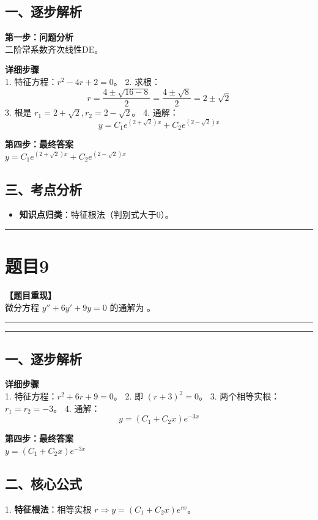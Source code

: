 \documentclass[12pt, a4paper]{ctexart}
\newcommand{\TopSeparator}{
    \par\noindent\rule{\textwidth}{1.5pt}\vspace{0.5em} %
}
\newcommand{\AnalysisSeparator}{
    \par\noindent\rule{\textwidth}{0.5pt}\vspace{0.2em}\hrule\vspace{0.5em} %
}
\newenvironment{RedAnalysis}{
    \par
    \color{red} %
}{
    \par
    \color{black} %
}
\begin{document}
\begin{RedAnalysis}

\subsection*{一、逐步解析}

\textbf{第一步：问题分析} \\
二阶常系数齐次线性DE。

\textbf{详细步骤} \\
1. 特征方程：$r^2 - 4r + 2 = 0$。
2. 求根：
   \[ r = \frac{4 \pm \sqrt{16-8}}{2} = \frac{4 \pm \sqrt{8}}{2} = 2 \pm \sqrt{2} \]
3. 根是 $r_1 = 2+\sqrt{2}, r_2 = 2-\sqrt{2}$。
4. 通解：
   \[ y = C_1 e^{(2+\sqrt{2})x} + C_2 e^{(2-\sqrt{2})x} \]

\textbf{第四步：最终答案} \\
$ y = C_1 e^{(2+\sqrt{2})x} + C_2 e^{(2-\sqrt{2})x} $

\subsection*{三、考点分析}
\begin{itemize}
    \item \textbf{知识点归类}：特征根法（判别式大于0）。
\end{itemize}

\end{RedAnalysis}

\vspace{2em}

\TopSeparator
\section*{题目9}

\textbf{【题目重现】} \\
微分方程 $ y'' + 6y' + 9y = 0 $ 的通解为 \underline{\hspace{2cm}}。

\AnalysisSeparator

\begin{RedAnalysis}

\subsection*{一、逐步解析}

\textbf{详细步骤} \\
1. 特征方程：$r^2 + 6r + 9 = 0$。
2. 即 $(r+3)^2 = 0$。
3. 两个相等实根：$r_1 = r_2 = -3$。
4. 通解：
   \[ y = (C_1 + C_2 x)e^{-3x} \]

\textbf{第四步：最终答案} \\
$ y = (C_1 + C_2 x)e^{-3x} $

\subsection*{二、核心公式}
1. \textbf{特征根法}：相等实根 $r \Rightarrow y = (C_1+C_2x)e^{rx}$。

\end{RedAnalysis}
\end{document}
